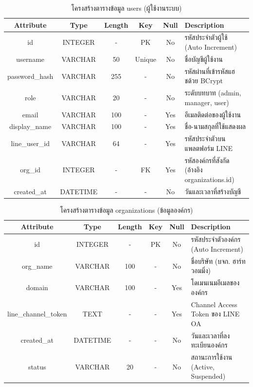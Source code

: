 \begin{table}[htbp]
\centering
\caption{โครงสร้างตารางข้อมูล users (ผู้ใช้งานระบบ)}
\label{tab3:tb_users}
\begin{tabularx}{\textwidth}{| c | c | c | c | c | L |}
\hline
\textbf{Attribute} & \textbf{Type} & \textbf{Length} & \textbf{Key} & \textbf{Null} & \textbf{Description} \\ \hline
id & INTEGER & - & PK & No & รหัสประจำตัวผู้ใช้ (Auto Increment) \\ \hline
username & VARCHAR & 50 & Unique & No & ชื่อบัญชีผู้ใช้งาน \\ \hline
password\_hash & VARCHAR & 255 & - & No & รหัสผ่านที่เข้ารหัสแฮชด้วย BCrypt \\ \hline
role & VARCHAR & 20 & - & No & ระดับบทบาท (admin, manager, user) \\ \hline
email & VARCHAR & 100 & - & Yes & อีเมลติดต่อของผู้ใช้งาน \\ \hline
display\_name & VARCHAR & 100 & - & Yes & ชื่อ-นามสกุลที่ใช้แสดงผล \\ \hline
line\_user\_id & VARCHAR & 64 & - & Yes & รหัสประจำตัวบนแพลตฟอร์ม LINE \\ \hline
org\_id & INTEGER & - & FK & Yes & รหัสองค์กรที่สังกัด (อ้างอิง organizations.id) \\ \hline
created\_at & DATETIME & - & - & No & วันและเวลาที่สร้างบัญชี \\ \hline
\end{tabularx}
\end{table}

\begin{table}[htbp]
\centering
\caption{โครงสร้างตารางข้อมูล organizations (ข้อมูลองค์กร)}
\label{tab3:tb_orgs}
\begin{tabularx}{\textwidth}{| c | c | c | c | c | L |}
\hline
\textbf{Attribute} & \textbf{Type} & \textbf{Length} & \textbf{Key} & \textbf{Null} & \textbf{Description} \\ \hline
id & INTEGER & - & PK & No & รหัสประจำตัวองค์กร (Auto Increment) \\ \hline
org\_name & VARCHAR & 100 & - & No & ชื่อบริษัท (บจก. ฮาร์ทวอมมิ่ง) \\ \hline
domain & VARCHAR & 100 & - & Yes & โดเมนเนมอีเมลขององค์กร \\ \hline
line\_channel\_token & TEXT & - & - & Yes & Channel Access Token ของ LINE OA \\ \hline
created\_at & DATETIME & - & - & No & วันและเวลาที่ลงทะเบียนองค์กร \\ \hline
status & VARCHAR & 20 & - & No & สถานะการใช้งาน (Active, Suspended) \\ \hline
\end{tabularx}
\end{table}

